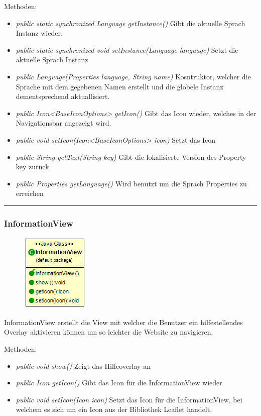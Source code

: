    Methoden: \begin{itemize} [noitemsep]
    \item \emph{public static synchronized Language getInstance()} Gibt die aktuelle Sprach Instanz wieder.
    \item \emph{public static synchronized void setInstance(Language language)} Setzt die aktuelle Sprach Instanz
    \item \emph{public Language(Properties language, String name)} Kosntruktor, welcher die Sprache mit dem gegebenen Namen erstellt und die globele Instanz dementsprechend aktuallisiert.
    \item \emph{public Icon<BaseIconOptions> getIcon()} Gibt das Icon wieder, welches in der Navigationsbar angezeigt wird.
    \item \emph{public void setIcon(Icon<BaseIconOptions> icon)} Setzt das Icon
    \item \emph{public String getText(String key)} Gibt die lokalisierte Version des Property key zurück
    \item \emph{public Properties getLanguage()} Wird benutzt um die Sprach Properties zu erreichen
\end{itemize}

\rule{\textwidth}{0.4pt}
\subsubsection{InformationView}
\begin{minipage}{0.3\textwidth}
    \begin{figure}[H]
        {\centering\includegraphics[scale = 0.7
        ]{media/view/view/InformationView_Class.png}}
    \end{figure}
    \end{minipage} \hfill
    \begin{minipage}{0.6\textwidth}
InformationView erstellt die View mit welcher die Benutzer ein hilfestellendes Overlay aktivieren können um so leichter 
die Website zu navigieren.
\end{minipage}
\vspace{\baselineskip}
Methoden: \begin{itemize} [noitemsep]
    \item \emph{public void show()} Zeigt das Hilfeoverlay an
    \item \emph{public Icon getIcon()} Gibt das Icon für die InformationView wieder
    \item \emph{public void setIcon(Icon icon)} Setzt das Icon für die InformationView, bei welchem es sich um ein Icon aus der Bibliothek \gls{Leaflet} handelt.
\end{itemize}

